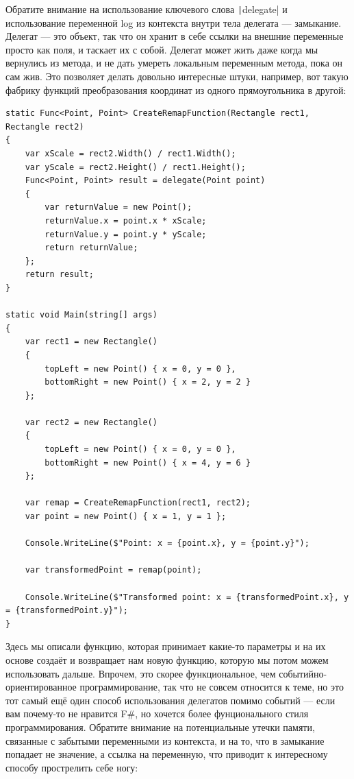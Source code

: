 \documentclass[a5paper]{article}
\begin{document}
Обратите внимание на использование ключевого слова \texttt|delegate| и использование переменной log из контекста внутри тела делегата --- замыкание. Делегат --- это объект, так что он хранит в себе ссылки на внешние переменные просто как поля, и таскает их с собой. Делегат может жить даже когда мы вернулись из метода, и не дать умереть локальным переменным метода, пока он сам жив. Это позволяет делать довольно интересные штуки, например, вот такую фабрику функций преобразования координат из одного прямоугольника в другой:

\begin{verbatim}
static Func<Point, Point> CreateRemapFunction(Rectangle rect1, Rectangle rect2)
{
    var xScale = rect2.Width() / rect1.Width();
    var yScale = rect2.Height() / rect1.Height();
    Func<Point, Point> result = delegate(Point point)
    {
        var returnValue = new Point();
        returnValue.x = point.x * xScale;
        returnValue.y = point.y * yScale;
        return returnValue;
    };
    return result;
}

static void Main(string[] args)
{
    var rect1 = new Rectangle()
    {
        topLeft = new Point() { x = 0, y = 0 },
        bottomRight = new Point() { x = 2, y = 2 }
    };

    var rect2 = new Rectangle()
    {
        topLeft = new Point() { x = 0, y = 0 },
        bottomRight = new Point() { x = 4, y = 6 }
    };

    var remap = CreateRemapFunction(rect1, rect2);
    var point = new Point() { x = 1, y = 1 };

    Console.WriteLine($"Point: x = {point.x}, y = {point.y}");

    var transformedPoint = remap(point);

    Console.WriteLine($"Transformed point: x = {transformedPoint.x}, y = {transformedPoint.y}");
}
\end{verbatim}

Здесь мы описали функцию, которая принимает какие-то параметры и на их основе создаёт и возвращает нам новую функцию, которую мы потом можем использовать дальше. Впрочем, это скорее функциональное, чем событийно-ориентированное программирование, так что не совсем относится к теме, но это тот самый ещё один способ использования делегатов помимо событий --- если вам почему-то не нравится F\#, но хочется более фунционального стиля программирования. Обратите внимание на потенциальные утечки памяти, связанные с забытыми переменными из контекста, и на то, что в замыкание попадает не значение, а ссылка на переменную, что приводит к интересному способу прострелить себе ногу:
\end{document}
